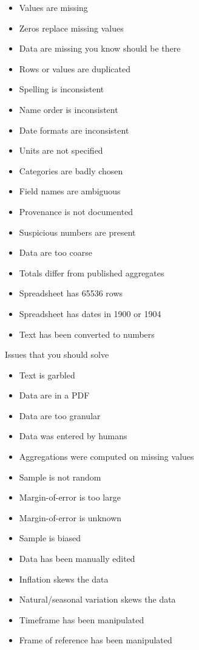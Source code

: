 \begin{itemize}
 \setlength{\parskip}{0pt}
 \setlength{\itemsep}{0pt plus 1pt}
 \item Values are missing
 \item Zeros replace missing values
 \item Data are missing you know should be there
 \item Rows or values are duplicated
 \item Spelling is inconsistent
 \item Name order is inconsistent
 \item Date formats are inconsistent
 \item Units are not specified
 \item Categories are badly chosen
 \item Field names are ambiguous
 \item Provenance is not documented
 \item Suspicious numbers are present
 \item Data are too coarse
 \item Totals differ from published aggregates
 \item Spreadsheet has 65536 rows
 \item Spreadsheet has dates in 1900 or 1904
 \item Text has been converted to numbers
\end{itemize}

Issues that you should solve
\begin{itemize}
 \setlength{\parskip}{0pt}
 \setlength{\itemsep}{0pt plus 1pt}
 \item Text is garbled
 \item Data are in a PDF
 \item Data are too granular
 \item Data was entered by humans
 \item Aggregations were computed on missing values
 \item Sample is not random
 \item Margin-of-error is too large
 \item Margin-of-error is unknown
 \item Sample is biased
 \item Data has been manually edited
 \item Inflation skews the data
 \item Natural/seasonal variation skews the data
 \item Timeframe has been manipulated
 \item Frame of reference has been manipulated
\end{itemize}

